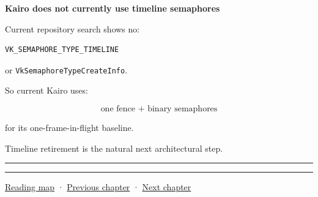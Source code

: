 \textbf{Kairo does not currently use timeline semaphores}

Current repository search shows no:

\begin{verbatim}
VK_SEMAPHORE_TYPE_TIMELINE
\end{verbatim}

or \texttt{VkSemaphoreTypeCreateInfo}.

So current Kairo uses:

\[
\boxed{
\text{one fence + binary semaphores}
}
\]

for its one-frame-in-flight baseline.

Timeline retirement is the natural next architectural step.

\begin{center}\rule{0.5\linewidth}{0.5pt}\end{center}

\begin{center}\rule{0.5\linewidth}{0.5pt}\end{center}

\hyperref[volume-reading-map]{Reading map} · \hyperref[05-engine-i-ch020]{Previous chapter} · \hyperref[05-engine-i-ch022]{Next chapter}
